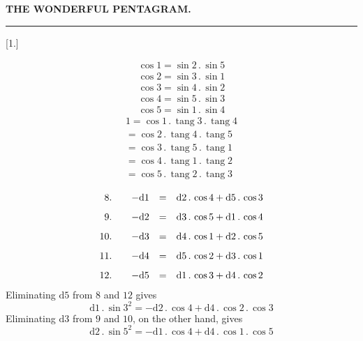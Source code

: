 \begingroup
\renewcommand{\arraystretch}{1.45}
\clearpage{}

\begin{center}
\textbf{THE WONDERFUL PENTAGRAM.}

\rule{39.96bp}{0.35pt}
\end{center}

\begin{center}
\resizebox{.94\linewidth}{!}{}
\end{center}



\par\medskip{}\centerline{[1.]}\nobreak\smallskip
\[
\begin{gathered}
\cos 1=\sin 2\, .\,\sin 5\\[8pt]
\cos 2=\sin 3\, .\,\sin 1\\[8pt]
\cos 3=\sin 4\, .\,\sin 2\\[8pt]
\cos 4=\sin 5\, .\,\sin 3\\[8pt]
\cos 5=\sin 1\, .\,\sin 4
\end{gathered}
\]
\[
\begin{gathered}
1=\cos 1\, .\,\operatorname{tang}3\, .\,\operatorname{tang}4\\[8pt]
 =\cos 2\, .\,\operatorname{tang}4\, .\,\operatorname{tang}5\\[8pt]
 =\cos 3\, .\,\operatorname{tang}5\, .\,\operatorname{tang}1\\[8pt]
 =\cos 4\, .\,\operatorname{tang}1\, .\,\operatorname{tang}2\\[8pt]
 =\cos 5\, .\,\operatorname{tang}2\, .\,\operatorname{tang}3
\end{gathered}
\]

\[
\begin{array}{r@{\qquad}rcl}
8.&-\mathrm{d}1&=&\mathrm{d}2\, .\,\cos 4+\mathrm{d}5\, .\,\cos 3\\[8pt]
9.&-\mathrm{d}2&=&\mathrm{d}3\, .\,\cos 5+\mathrm{d}1\, .\,\cos 4\\[8pt]
10.&-\mathrm{d}3&=&\mathrm{d}4\, .\,\cos 1+\mathrm{d}2\, .\,\cos 5\\[8pt]
11.&-\mathrm{d}4&=&\mathrm{d}5\, .\,\cos 2+\mathrm{d}3\, .\,\cos 1\\[8pt]
12.&-\mathrm{d}5&=&\mathrm{d}1\, .\,\cos 3+\mathrm{d}4\, .\,\cos 2
\end{array}
\]
Eliminating $\mathrm{d}5$ from $8$ and $12$ gives
\[
\mathrm{d}1\, .\,\sin 3^2=-\mathrm{d}2\, .\,\cos 4+\mathrm{d}4\, .\,\cos 2\, .\,\cos 3
\]
Eliminating $\mathrm{d}3$ from $9$ and $10$, on the other hand, gives
\[
\mathrm{d}2\, .\,\sin 5^2=-\mathrm{d}1\, .\,\cos 4+\mathrm{d}4\, .\,\cos 1\, .\,\cos 5
\]
\clearpage
\endgroup
